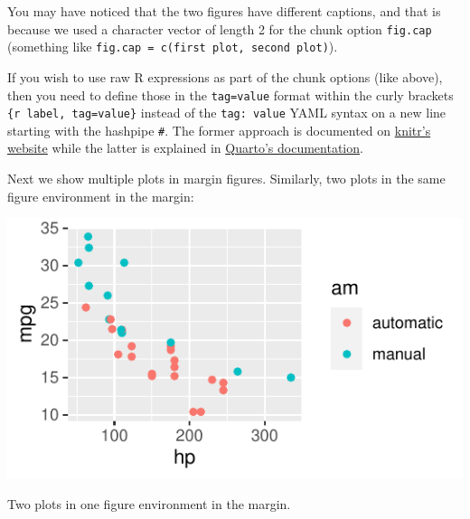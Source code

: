 \documentclass[
  letterpaper,
  DIV=11,
  numbers=noendperiod,
  oneside]{scrartcl}
\begin{document}
You may have noticed that the two figures have different captions, and
that is because we used a character vector of length 2 for the chunk
option \texttt{fig.cap} (something like
\texttt{fig.cap\ =\ c(\textquotesingle{}first\ plot\textquotesingle{},\ \textquotesingle{}second\ plot\textquotesingle{})}).

\begin{tcolorbox}[enhanced jigsaw, leftrule=.75mm, colbacktitle=quarto-callout-tip-color!10!white, colframe=quarto-callout-tip-color-frame, left=2mm, bottomrule=.15mm, rightrule=.15mm, coltitle=black, title=\textcolor{quarto-callout-tip-color}{\faLightbulb}\hspace{0.5em}{Using R within Chunk Options}, bottomtitle=1mm, breakable, toptitle=1mm, titlerule=0mm, colback=white, opacitybacktitle=0.6, toprule=.15mm, opacityback=0, arc=.35mm]

If you wish to use raw R expressions as part of the chunk options (like
above), then you need to define those in the \texttt{tag=value} format
within the curly brackets \texttt{\{r\ label,\ tag=value\}} instead of
the \texttt{tag:\ value} YAML syntax on a new line starting with the
hashpipe \texttt{\#\textbar{}}. The former approach is documented on
\href{https://yihui.org/knitr/options/}{knitr's website} while the
latter is explained in
\href{https://quarto.org/docs/reference/cells/cells-knitr.html}{Quarto's
documentation}.

\end{tcolorbox}

Next we show multiple plots in margin figures. Similarly, two plots in
the same figure environment in the margin:

\begin{marginfigure}

{\centering \includegraphics{HousePrices_files/figure-pdf/fig-margin-together-1.pdf}

}

\caption{\label{fig-margin-together-1}Two plots in one figure
environment in the margin.}

\end{marginfigure}
\end{document}
